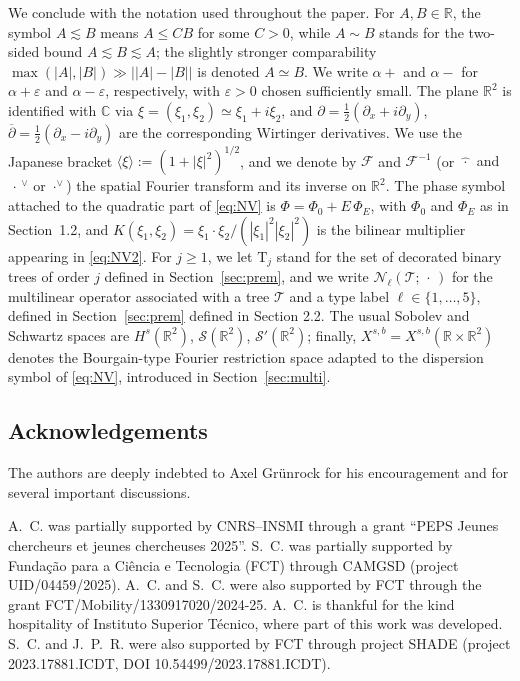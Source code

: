 \documentclass[a4paper,
11pt,  reqno]{amsart}
\newcommand{\blue}{\color{blue}}
\newcommand{\orange}{\color{orange}}
\newcommand{\jap}[1]{\langle #1 \rangle}
\newcommand{\5}{\textup{V}}
\theoremstyle{remark}
\newcommand{\R}{\mathbb{R}}
\newcommand{\CC}{\mathbb{C}}
\newcommand{\TT}{\mathcal{T}}
\newcommand{\Tr}{\mathrm{T}}
\renewcommand{\l}{\ell}
\numberwithin{equation}{section}
\numberwithin{theorem}{section}
\newcommand{\Ncal}{\mathcal{N}}
\begin{document}
We conclude with the notation used throughout the paper. For $A,B\in\R$, the symbol $A\lesssim B$ means $A\le C B$ for some $C>0$, while $A\sim B$ stands for the two-sided bound $A\lesssim B\lesssim A$; the slightly stronger comparability $\max(|A|,|B|)\gg\big||A|-|B|\big|$ is denoted $A\simeq B$. We write $\alpha+$ and $\alpha-$ for $\alpha+\varepsilon$ and $\alpha-\varepsilon$, respectively, with $\varepsilon>0$ chosen sufficiently small. The plane $\R^2$ is identified with $\CC$ via $\xi=(\xi_1,\xi_2)\simeq\xi_1+i\xi_2$, and $\partial=\tfrac12(\partial_x+i\partial_y)$, $\overline\partial=\tfrac12(\partial_x-i\partial_y)$ are the corresponding Wirtinger derivatives. We use the Japanese bracket $\jap{\xi}:=(1+|\xi|^2)^{1/2}$, and we denote by $\mathcal{F}$ and $\mathcal{F}^{-1}$ (or {\orange $\widehat{\,\cdot\,}$ and $\,\cdot\,^{\vee}$} {\blue or $\cdot^\vee$}) the spatial Fourier transform and its inverse on $\R^2$. The phase symbol attached to the quadratic part of \eqref{eq:NV} is $\Phi=\Phi_0+E\,\Phi_E$, with $\Phi_0$ and $\Phi_E$ as in Section~1.2, and $K(\xi_1,\xi_2)=\xi_1\cdot\xi_2/(|\xi_1|^2|\xi_2|^2)$ is the bilinear multiplier appearing in \eqref{eq:NV2}. For $j\ge 1$, we let $\Tr_j$ stand for the set of decorated binary trees of order $j$ defined in Section~\ref{sec:prem}, and we write $\Ncal_\l(\TT;\,\cdot\,)$ for the multilinear operator associated with a tree $\TT$ and a type label $\l\in\{1,\dots,5\}${\orange , defined in Section~\ref{sec:prem}} {\blue defined in Section 2.2}. The usual Sobolev and Schwartz spaces are $H^s(\R^2)$, $\mathcal{S}(\R^2)$, $\mathcal{S}'(\R^2)$; finally, $X^{s,b}=X^{s,b}(\R\times\R^2)$ denotes the Bourgain-type Fourier restriction space adapted to the dispersion symbol of \eqref{eq:NV}, introduced in Section~\ref{sec:multi}.


\subsection{Acknowledgements}

The authors are deeply indebted to Axel Gr\"unrock for his encouragement and for several important discussions.

\medskip

A.~C. was partially supported by CNRS--INSMI through a grant ``PEPS Jeunes chercheurs et jeunes chercheuses 2025''. S.~C. was partially supported by Funda\c{c}\~ao para a Ci\^encia e Tecnologia (FCT) through CAMGSD (project UID/04459/2025). A.~C. and S.~C. were also supported by FCT through the grant FCT/Mobility/1330917020/2024-25. A.~C. is thankful for the kind hospitality of Instituto Superior T\'ecnico, where part of this work was developed. S.~C. and J.~P.~R. were also supported by FCT through project SHADE (project 2023.17881.ICDT, DOI 10.54499/2023.17881.ICDT).
\end{document}
